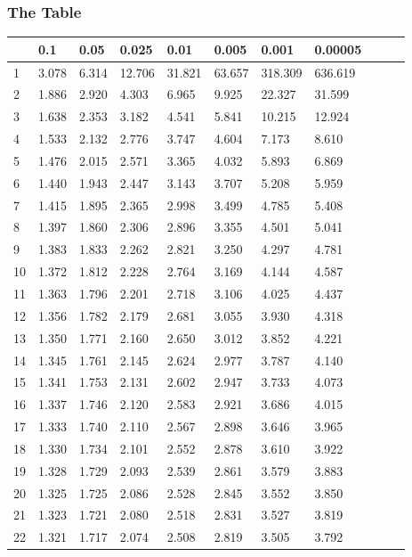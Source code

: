 \begin{frame}
  \frametitle{The Table}
  {
\fontsize{5pt}{5pt}
\selectfont

\begin{tabular}{l|llllllllll}
 & 0.1&0.05&0.025&0.01&0.005&0.001&0.00005\\ \hline
 1 & 3.078 & 6.314 & 12.706 & 31.821 & 63.657 & 318.309 & 636.619 \\ 
 2 & 1.886 & 2.920 & 4.303 & 6.965 & 9.925 & 22.327 & 31.599 \\ 
 3 & 1.638 & 2.353 & 3.182 & 4.541 & 5.841 & 10.215 & 12.924 \\ 
 4 & 1.533 & 2.132 & 2.776 & 3.747 & 4.604 & 7.173 & 8.610 \\ 
 5 & 1.476 & 2.015 & 2.571 & 3.365 & 4.032 & 5.893 & 6.869 \\ 
[5pt]
 6 & 1.440 & 1.943 & 2.447 & 3.143 & 3.707 & 5.208 & 5.959 \\ 
 7 & 1.415 & 1.895 & 2.365 & 2.998 & 3.499 & 4.785 & 5.408 \\ 
 8 & 1.397 & 1.860 & 2.306 & 2.896 & 3.355 & 4.501 & 5.041 \\ 
 9 & 1.383 & 1.833 & 2.262 & 2.821 & 3.250 & 4.297 & 4.781 \\ 
10 & 1.372 & 1.812 & 2.228 & 2.764 & 3.169 & 4.144 & 4.587 \\ 
[5pt]
11 & 1.363 & 1.796 & 2.201 & 2.718 & 3.106 & 4.025 & 4.437 \\ 
12 & 1.356 & 1.782 & 2.179 & 2.681 & 3.055 & 3.930 & 4.318 \\ 
13 & 1.350 & 1.771 & 2.160 & 2.650 & 3.012 & 3.852 & 4.221 \\ 
14 & 1.345 & 1.761 & 2.145 & 2.624 & 2.977 & 3.787 & 4.140 \\ 
15 & 1.341 & 1.753 & 2.131 & 2.602 & 2.947 & 3.733 & 4.073 \\ 
[5pt]
16 & 1.337 & 1.746 & 2.120 & 2.583 & 2.921 & 3.686 & 4.015 \\ 
17 & 1.333 & 1.740 & 2.110 & 2.567 & 2.898 & 3.646 & 3.965 \\ 
18 & 1.330 & 1.734 & 2.101 & 2.552 & 2.878 & 3.610 & 3.922 \\ 
19 & 1.328 & 1.729 & 2.093 & 2.539 & 2.861 & 3.579 & 3.883 \\ 
20 & 1.325 & 1.725 & 2.086 & 2.528 & 2.845 & 3.552 & 3.850 \\ 
[5pt]
21 & 1.323 & 1.721 & 2.080 & 2.518 & 2.831 & 3.527 & 3.819 \\ 
22 & 1.321 & 1.717 & 2.074 & 2.508 & 2.819 & 3.505 & 3.792 \\ 

\end{tabular}}
\end{frame}
